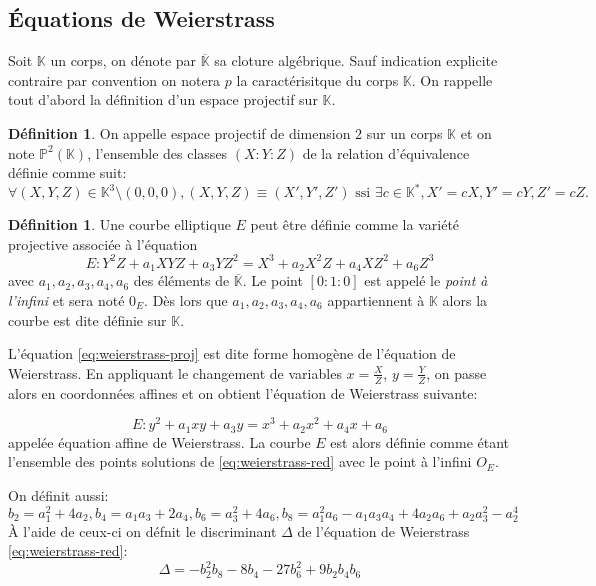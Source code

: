 \documentclass[10pt,a4paper]{book}
\theoremstyle{plain}
\theoremstyle{definition}
\theoremstyle{definition}
\theoremstyle{definition}
\theoremstyle{definition}
\newtheorem{defi}[thm]{Définition}
\theoremstyle{remark}
\theoremstyle{remark}
\theoremstyle{definition}
\begin{document}
\subsection{\'Equations de Weierstrass}

Soit $\mathbb{K}$ un corps, on dénote par $\overline{\mathbb{K}}$ sa cloture algébrique. Sauf indication explicite contraire par convention on notera $p$ la caractérisitque du corps $\mathbb{K}$. On rappelle tout d'abord  la définition d'un espace projectif sur $\mathbb{K}$.

\begin{defi}
On appelle espace projectif de dimension $2$ sur un corps $\mathbb{K}$ et on note $\mathbb{P}^2(\mathbb{K})$, l'ensemble des classes $(X:Y:Z)$ de la relation d'équivalence définie comme suit:
\begin{equation*}
\forall (X,Y,Z) \in \mathbb{K}^3 \setminus (0,0,0), (X,Y,Z) \equiv (X',Y',Z') \text{ ssi }\exists c \in \mathbb{K}^*, X'=cX, Y'=cY, Z'=cZ.
\end{equation*}
\end{defi}

\begin{defi}
Une courbe elliptique $E$ peut être définie comme la variété projective associée à l'équation
\begin{equation}
\label{eq:weierstrass-proj}
E:Y^2Z+a_1XYZ+a_3YZ^2=X^3+a_2X^2Z+a_4XZ^2+a_6Z^3
\end{equation}
avec $a_1,a_2,a_3,a_4,a_6$ des éléments de $\overline{\mathbb{K}}$. Le point $[0:1:0]$ est appelé le \emph{point à l'infini} et sera noté $0_E$. Dès lors que $a_1,a_2,a_3,a_4,a_6$ appartiennent à $\mathbb{K}$ alors la courbe est dite définie sur $\mathbb{K}$.
\end{defi}

L'équation \eqref{eq:weierstrass-proj} est dite forme homogène de l'équation de Weierstrass. En appliquant le changement de variables $x=\frac{X}{Z}$, $y=\frac{Y}{Z}$, on passe alors en coordonnées affines et on obtient l'équation de Weierstrass suivante:

\begin{equation}
\label{eq:weierstrass-red}
E:y^2+a_1xy+a_3y=x^3+a_2x^2+a_4x+a_6
\end{equation}
appelée équation affine de Weierstrass. La courbe $E$ est alors définie comme étant l'ensemble des points solutions de \eqref{eq:weierstrass-red} avec le point à l'infini $O_E$.

 On définit aussi:
\begin{equation*}
b_2=a_1^2+4a_2, b_4=a_1a_3+2a_4, b_6=a_3^2+4a_6, b_8=a_1^2a_6-a_1a_3a_4+4a_2a_6+a_2a_3^2-a_2^4
\end{equation*}
\`A l'aide de ceux-ci on défnit le discriminant $\Delta$ de l'équation de Weierstrass \eqref{eq:weierstrass-red}:
\begin{equation*}
\Delta = -b_2^2b_8-8b_4-27b_6^2+9b_2b_4b_6
\end{equation*}
\end{document}
